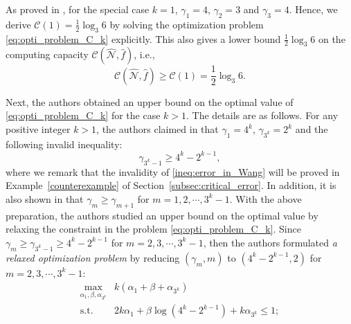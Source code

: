 \documentclass[11pt,draftclsnofoot,onecolumn]{IEEEtran}
\makeatletter
\newcommand{\Rmnum}[1]{\expandafter\@slowromancap\romannumeral #1@}
\makeatother
\begin{document}
\begin{journalonly}
{ As proved in \cite[Section~\Rmnum{3}-A]{Wang-Tightness_upper_bound}, for the special case $k=1$,  $\gamma_{1}=4$, $\gamma_{2}=3$ and $\gamma_{3}=4$.
  Hence, we  derive $\mathcal{C}(1)=\frac{1}{2}\log_{3}6$ by solving the optimization problem \eqref{eq:opti_problem_C_k} explicitly. This also gives a lower bound $\frac{1}{2}\log_{3}6$ on
 the computing capacity $\mathcal{C}(\widehat{\mathcal{N}},\widehat{f})$, i.e.,
 \begin{equation}
 \mathcal{C}(\widehat{\mathcal{N}},\widehat{f})\geq\mathcal{C}(1)=\frac{1}{2}\log_{3}6.\label{eq:C(1)-value}
 \end{equation}

Next, the authors  obtained an upper bound on the optimal value of \eqref{eq:opti_problem_C_k} for the case  $k> 1$. The details are as follows.
 For any positive integer $k>1$, the authors claimed in \cite[Lemma~1]{Wang-Tightness_upper_bound} that $\gamma_{1}=4^{k}$,  $\gamma_{3^{k}}=2^{k}$ and the following invalid inequality:
\begin{equation}
\gamma_{3^{k}-1}\geq 4^{k}-2^{k-1},\label{ineq:error_in_Wang}
\end{equation}
where we remark that
the invalidity of \eqref{ineq:error_in_Wang} will be proved in Example~\ref{counterexample} of Section~\ref{subsec:critical_error}.
In addition, it is also shown in \cite[Lemma~2]{Wang-Tightness_upper_bound} that
$\gamma_{m}\geq\gamma_{m+1}$ for $m = 1, 2,\cdots, 3^{k}-1$.
With the above preparation, the authors studied an upper bound on the optimal value by
relaxing the constraint in the problem \eqref{eq:opti_problem_C_k}. Since  $\gamma_{m}\geq\gamma_{3^{k}-1}\geq 4^{k}-2^{k-1}$ for $m =  2,3,\cdots, 3^{k}-1$, then the authors  formulated \emph{a relaxed optimization problem} by reducing $(\gamma_{m},m)$ to $(4^{k}-2^{k-1},2)$ for $m=2,3,\cdots,3^{k}-1$:
\begin{equation}
	\begin{split}
		\max_{\alpha_{1},\beta,\alpha_{3^{k}}}&k(\alpha_{1}+\beta+\alpha_{3^{k}})\\
		\text{s.t.}\quad&2k\alpha_{1}+\beta\log(4^{k}-2^{k-1})+k\alpha_{3^{k}}\leq 1;\\

\end{split}
\end{equation}}
\end{journalonly}
\end{document}
